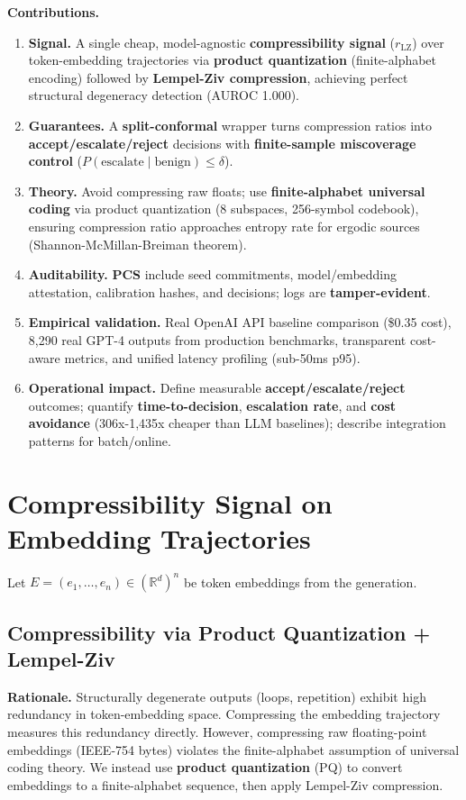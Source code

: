\documentclass[11pt]{article}
\begin{document}
\textbf{Contributions.}
\begin{enumerate}
\item \textbf{Signal.} A single cheap, model-agnostic \textbf{compressibility signal} ($r_{\text{LZ}}$) over token-embedding trajectories via \textbf{product quantization} (finite-alphabet encoding) followed by \textbf{Lempel-Ziv compression}, achieving perfect structural degeneracy detection (AUROC 1.000).
\item \textbf{Guarantees.} A \textbf{split-conformal} wrapper turns compression ratios into \textbf{accept/escalate/reject} decisions with \textbf{finite-sample miscoverage control} ($P(\text{escalate} \mid \text{benign}) \leq \delta$).
\item \textbf{Theory.} Avoid compressing raw floats; use \textbf{finite-alphabet universal coding} via product quantization (8 subspaces, 256-symbol codebook), ensuring compression ratio approaches entropy rate for ergodic sources (Shannon-McMillan-Breiman theorem).
\item \textbf{Auditability.} \textbf{PCS} include seed commitments, model/embedding attestation, calibration hashes, and decisions; logs are \textbf{tamper-evident}.
\item \textbf{Empirical validation.} Real OpenAI API baseline comparison (\$0.35 cost), 8,290 real GPT-4 outputs from production benchmarks, transparent cost-aware metrics, and unified latency profiling (sub-50ms p95).
\item \textbf{Operational impact.} Define measurable \textbf{accept/escalate/reject} outcomes; quantify \textbf{time-to-decision}, \textbf{escalation rate}, and \textbf{cost avoidance} (306x-1,435x cheaper than LLM baselines); describe integration patterns for batch/online.
\end{enumerate}

\section{Compressibility Signal on Embedding Trajectories}
\label{sec:signals}

Let $E=(e_1,\dots,e_n)\in(\mathbb{R}^d)^n$ be token embeddings from the generation.

\subsection{Compressibility via Product Quantization + Lempel-Ziv}
\label{sec:signal-rlz}

\textbf{Rationale.} Structurally degenerate outputs (loops, repetition) exhibit high redundancy in token-embedding space. Compressing the embedding trajectory measures this redundancy directly. However, compressing raw floating-point embeddings (IEEE-754 bytes) violates the finite-alphabet assumption of universal coding theory. We instead use \textbf{product quantization} (PQ) to convert embeddings to a finite-alphabet sequence, then apply Lempel-Ziv compression.
\end{document}
